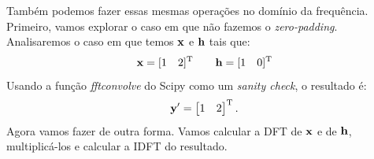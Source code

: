 \documentclass{homeworkclass}
\begin{document}
\begin{homeworkProblem}
	Também podemos fazer essas mesmas operações no domínio da frequência. Primeiro, vamos explorar o caso em que não fazemos o \textit{zero-padding}.
	Analisaremos o caso em que temos $\mathbf{x}$ e $\mathbf{h}$ tais que:
	\begin{equation*}
	\mathbf{x} = [1 \quad 2]^{\mathrm{T}} \qquad
	\mathbf{h} = [1 \quad 0]^{\mathrm{T}}
	\end{equation*}
	Usando a função \textit{fftconvolve} do Scipy como um \textit{sanity check}, o resultado é:
	\begin{equation*}
	\mathbf{y}^\prime = \begin{bmatrix}
	1 \quad 2
	\end{bmatrix}^{\mathrm{T}}.
	\end{equation*}
	Agora vamos fazer de outra forma. Vamos calcular a DFT de $\mathbf{x}$ e de $\mathbf{h}$, multiplicá-los e calcular a IDFT do resultado.
	

\end{homeworkProblem}
\end{document}
